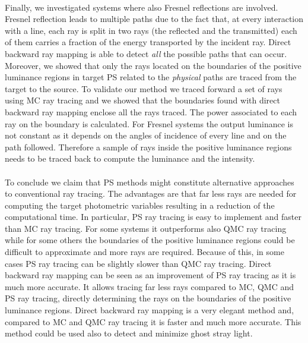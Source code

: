 \\ \indent
Finally, we investigated systems where also Fresnel reflections are involved. Fresnel reflection leads to multiple paths due to the fact that, at every interaction with a line, each ray is split in two rays (the reflected and the transmitted) each of them carries a fraction of the energy transported by the incident ray. Direct backward ray mapping is able to detect \textit{all} the possible paths that can occur. Moreover, we showed that only the rays located on the boundaries of the positive luminance regions in target PS related to the \textit{physical} paths are traced from the target to the source. To validate our method we traced forward a set of rays using MC ray tracing and we showed that the boundaries found with direct backward ray mapping enclose all the rays traced. The power associated to each ray on the boundary is calculated. For Fresnel systems the output luminance is not constant as it depends on the angles of incidence of every line and on the path followed. Therefore a sample of rays inside the positive luminance regions needs to be traced back to compute the luminance and the intensity.
\\ \\ \indent To conclude we claim that PS methods might constitute alternative approaches to conventional ray tracing. The advantages are that far less rays are needed for computing the target photometric variables resulting in a reduction of the computational time. In particular, PS ray tracing is easy to implement and faster than MC ray tracing. For some systems it outperforms also QMC ray tracing while for some others the boundaries of the positive luminance regions could be difficult to approximate and more rays are required. Because of this, in some cases PS ray tracing can be slightly slower than QMC ray tracing. Direct backward ray mapping can be seen as an improvement of PS ray tracing as it is much more accurate. It allows tracing far less rays compared to MC, QMC and PS ray tracing, directly determining the rays on the boundaries of the positive luminance regions. Direct backward ray mapping is a very elegant method and, compared to MC and QMC ray tracing it is faster and much more accurate. This method could be used also to detect and minimize ghost stray light. 
